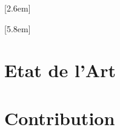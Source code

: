 \documentclass[a4paper,11pt,twoside]{book}
\begin{document}

    [2.6em]                  %
    {\bfseries}              %
    {\contentslabel{2.3em}}  %
    {\hspace*{-2.3em}}
    {\hfill\contentspage}

    [5.8em]
    {}
    {\contentslabel{3.2em}}
    {}
    {\hfill\contentspage}

    \newcommand{\PartialToc}{%
        \vspace*{1pc}\vbox{\textbf{Sommaire}}\vspace*{0.5pc}
        \hrule\vspace*{0.5pc}
        \startcontents[chapters]
        \printcontents[chapters]{p}{1}{}\vspace*{0.5pc}\hrule}
    \cleardoublepage
    \tableofcontents
    \mainmatter
    \part{Etat de l'Art}
    
    
    
    \part{Contribution}
	
	
    
    \appendix
    
    \printglossaries
    
    
\end{document}
